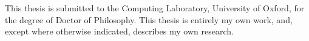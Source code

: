 This thesis is submitted to the Computing Laboratory,
University of Oxford, for the degree of Doctor of Philosophy. This
thesis is entirely my own work, and, except where otherwise indicated,
describes my own research.
